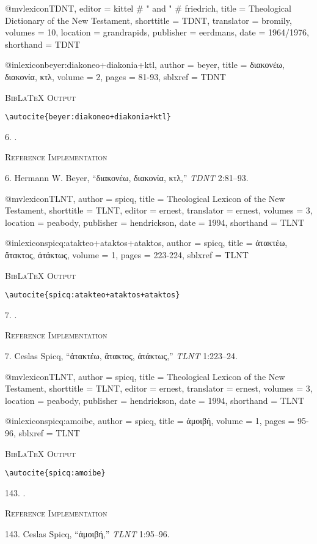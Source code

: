 \documentclass[a4paper]{article}
\newcommand{\gr}[1]{{\greekfont #1}}
\newcommand\citetestlex[2]{%
  {\textsc{BibLaTeX Output}\par
   \nobreak
   \texttt{\textbackslash autocite\{#2\}}\par
   \color{biblatex-colour}
   #1. \cite{#2}.\par}}
\newenvironment{refimp}{%
  \begin{minipage}{\linewidth}
    \setlength{\parskip}{1ex}
    \textsc{Reference Implementation}\par
    \nobreak
    \color{reference-colour}
}{\end{minipage}}
\newenvironment{vb}{%
  \setlength{\parskip}{0pt}
  \verbatim}{\endverbatim}
\begin{document}
\begin{vb}
@mvlexicon{TDNT,
  editor = kittel # " and " # friedrich,
  title = {Theological Dictionary of the New Testament},
  shorttitle = {TDNT},
  translator = bromily,
  volumes = {10},
  location = grandrapids,
  publisher = eerdmans,
  date = {1964/1976},
  shorthand = {TDNT}
}

@inlexicon{beyer:diakoneo+diakonia+ktl,
  author = beyer,
  title = {\gr{διακονέω, διακονία, κτλ}},
  volume = {2},
  pages = {81-93},
  sblxref = {TDNT}
}
\end{vb}
  
\citetestlex{6}{beyer:diakoneo+diakonia+ktl}

\begin{refimp}
  6. Hermann W. Beyer, “\gr{διακονέω, διακονία, κτλ},” \emph{TDNT} 2:81–93.
\end{refimp}

\begin{vb}
@mvlexicon{TLNT,
  author = spicq,
  title = {Theological Lexicon of the New Testament},
  shorttitle = {TLNT},
  editor = ernest,
  translator = ernest,
  volumes = {3},
  location = peabody,
  publisher = hendrickson,
  date = {1994},
  shorthand = {TLNT}
}

@inlexicon{spicq:atakteo+ataktos+ataktos,
  author = spicq,
  title = {\gr{ἀτακτέω, ἄτακτος, ἀτάκτως}},
  volume = {1},
  pages = {223-224},
  sblxref = {TLNT}
}
\end{vb}

\citetestlex{7}{spicq:atakteo+ataktos+ataktos}

\begin{refimp}
  7. Ceslas Spicq, “\gr{ἀτακτέω, ἄτακτος, ἀτάκτως},” \emph{TLNT} 1:223–24.
\end{refimp}

\begin{vb}
@mvlexicon{TLNT,
  author = spicq,
  title = {Theological Lexicon of the New Testament},
  shorttitle = {TLNT},
  editor = ernest,
  translator = ernest,
  volumes = {3},
  location = peabody,
  publisher = hendrickson,
  date = {1994},
  shorthand = {TLNT}
}

@inlexicon{spicq:amoibe,
  author = spicq,
  title = {\gr{ἀμοιβή}},
  volume = {1},
  pages = {95-96},
  sblxref = {TLNT}
}
\end{vb}

\citetestlex{143}{spicq:amoibe}

\begin{refimp}
  143. Ceslas Spicq, “\gr{ἀμοιβή},” \emph{TLNT} 1:95–96.
\end{refimp}
\end{document}
